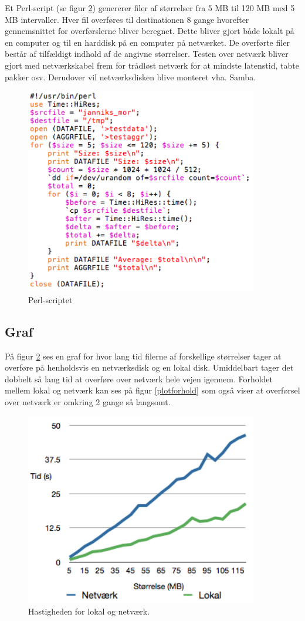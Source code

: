 \documentclass{article}
\begin{document}
Et Perl-script (se figur \ref{ploto}) genererer filer af størrelser fra 5 MB til 120 MB med 5 MB intervaller. Hver fil overføres til destinationen 8 gange hvorefter gennemsnittet for overførslerne bliver beregnet. Dette bliver gjort både lokalt på en computer og til en harddisk på en computer på netværket. De overførte filer består af tilfældigt indhold af de angivne størrelser. Testen over netværk bliver gjort med netværkskabel frem for trådløst netværk for at mindste latenstid, tabte pakker osv. Derudover vil netværksdisken blive monteret vha. Samba.

\begin{figure}
	\includegraphics[width=4in]{kode.png}
	\caption{Perl-scriptet}
	\label{ploto}
\end{figure}

\subsection{Graf}
På figur \ref{ploto} ses en graf for hvor lang tid filerne af forskellige størrelser tager at overføre på henholdsvis en netværksdisk og en lokal disk. Umiddelbart tager det dobbelt så lang tid at overføre over netværk hele vejen igennem. Forholdet mellem lokal og netværk kan ses på figur \ref{plotforhold} som også viser at overførsel over netværk er omkring 2 gange så langsomt.

\begin{figure}
	\includegraphics[width=4in]{ploto.png}
	\caption{Hastigheden for lokal og netværk.}
	\label{ploto}
\end{figure}
\end{document}
